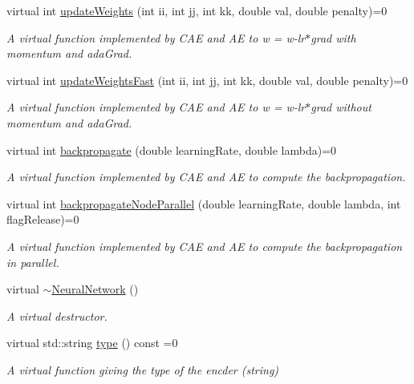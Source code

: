\begin{DoxyCompactItemize}
virtual int \hyperlink{classNeuralNetwork_acd83d73dbae85f80c1173bdb53e37726}{update\+Weights} (int ii, int jj, int kk, double val, double penalty)=0
\begin{DoxyCompactList}\small\item\em A virtual function implemented by C\+AE and AE to w = w-\/lr$\ast$grad with momentum and ada\+Grad. \end{DoxyCompactList}\item 
virtual int \hyperlink{classNeuralNetwork_a1bc1c063c3048b0551ae92352b553060}{update\+Weights\+Fast} (int ii, int jj, int kk, double val, double penalty)=0
\begin{DoxyCompactList}\small\item\em A virtual function implemented by C\+AE and AE to w = w-\/lr$\ast$grad without momentum and ada\+Grad. \end{DoxyCompactList}\item 
virtual int \hyperlink{classNeuralNetwork_af21bec3f1affe1a95346a57fd332f734}{backpropagate} (double learning\+Rate, double lambda)=0
\begin{DoxyCompactList}\small\item\em A virtual function implemented by C\+AE and AE to compute the backpropagation. \end{DoxyCompactList}\item 
virtual int \hyperlink{classNeuralNetwork_a01f72adec49e446ad4305bd6ad9859da}{backpropagate\+Node\+Parallel} (double learning\+Rate, double lambda, int flag\+Release)=0
\begin{DoxyCompactList}\small\item\em A virtual function implemented by C\+AE and AE to compute the backpropagation in parallel. \end{DoxyCompactList}\item 
virtual \hyperlink{classNeuralNetwork_a65475a7d7b05d302392333302626b2f8}{$\sim$\+Neural\+Network} ()
\begin{DoxyCompactList}\small\item\em A virtual destructor. \end{DoxyCompactList}\item 
virtual std\+::string \hyperlink{classNeuralNetwork_aa3edc74bdbc4d8730c0fcc935dad2af0}{type} () const  =0
\begin{DoxyCompactList}\small\item\em A virtual function giving the type of the encder (string) \end{DoxyCompactList}\item 

\end{DoxyCompactItemize}
